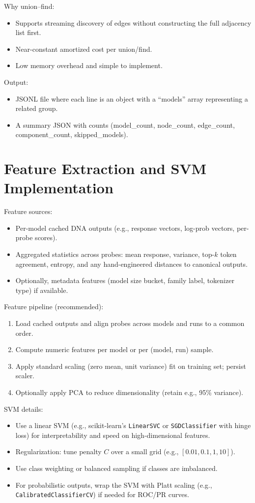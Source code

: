 \documentclass[11pt,a4paper]{article}
\begin{document}
Why union--find:
\begin{itemize}
  \item Supports streaming discovery of edges without constructing the full adjacency list first.
  \item Near-constant amortized cost per union/find.
  \item Low memory overhead and simple to implement.
\end{itemize}

Output:
\begin{itemize}
  \item JSONL file where each line is an object with a ``models'' array representing a related group.
  \item A summary JSON with counts (model\_count, node\_count, edge\_count, component\_count, skipped\_models).
\end{itemize}

\section{Feature Extraction and SVM Implementation}
Feature sources:
\begin{itemize}
  \item Per-model cached DNA outputs (e.g., response vectors, log-prob vectors, per-probe scores).
  \item Aggregated statistics across probes: mean response, variance, top-$k$ token agreement, entropy, and any hand-engineered distances to canonical outputs.
  \item Optionally, metadata features (model size bucket, family label, tokenizer type) if available.
\end{itemize}

Feature pipeline (recommended):
\begin{enumerate}
  \item Load cached outputs and align probes across models and runs to a common order.
  \item Compute numeric features per model or per (model, run) sample.
  \item Apply standard scaling (zero mean, unit variance) fit on training set; persist scaler.
  \item Optionally apply PCA to reduce dimensionality (retain e.g., 95\% variance).
\end{enumerate}

SVM details:
\begin{itemize}
  \item Use a linear SVM (e.g., scikit-learn's \texttt{LinearSVC} or \texttt{SGDClassifier} with hinge loss) for interpretability and speed on high-dimensional features.
  \item Regularization: tune penalty $C$ over a small grid (e.g., $[0.01,0.1,1,10]$).
  \item Use class weighting or balanced sampling if classes are imbalanced.
  \item For probabilistic outputs, wrap the SVM with Platt scaling (e.g., \texttt{CalibratedClassifierCV}) if needed for ROC/PR curves.
\end{itemize}
\end{document}
